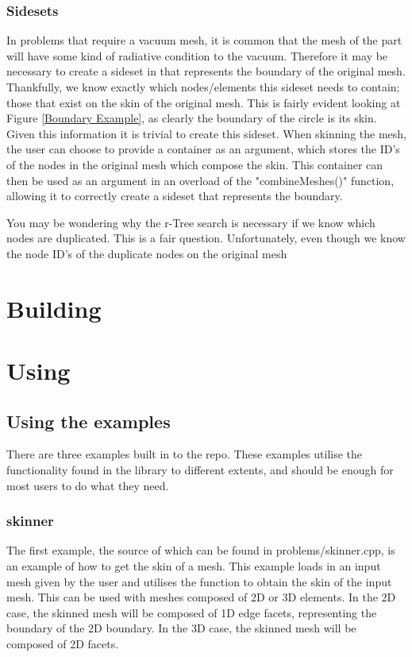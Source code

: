\documentclass[12pt, letterpaper]{article}
\begin{document}
\subsubsection{Sidesets}
In problems that require a vacuum mesh, it is common that the mesh of the part will have some kind of radiative condition to the vacuum. Therefore it may be necessary to create a sideset in that represents the boundary of the original mesh. Thankfully, we know exactly which nodes/elements this sideset needs to contain; those that exist on the skin of the original mesh. This is fairly evident looking at Figure \ref{Boundary Example}, as clearly the boundary of the circle is its skin. Given this information it is trivial to create this sideset. When skinning the mesh, the user can choose to provide a container as an argument, which stores the ID's of the nodes in the original mesh which compose the skin. This container can then be used as an argument in an overload of the "combineMeshes()" function, allowing it to correctly create a sideset that represents the boundary.

You may be wondering why the r-Tree search is necessary if we know which nodes are duplicated. This is a fair question. Unfortunately, even though we know the node ID's of the duplicate nodes on the original mesh
\section{Building}

\section{Using}
\subsection{Using the examples}
There are three examples built in to the repo. These examples utilise  the functionality found in the library to different extents, and should be enough for most users to do what they need.

\subsubsection{skinner}
The first example, the source of which can be found in problems/skinner.cpp, is an example of how to get the skin of a mesh. This example loads in an input mesh given by the user and utilises the function  to obtain the skin of the input mesh. This can be used with meshes composed of 2D or 3D elements. In the 2D case, the skinned mesh will be composed of 1D edge facets, representing the boundary of the 2D boundary. In the 3D case, the skinned mesh will be composed of 2D facets. 
\end{document}
